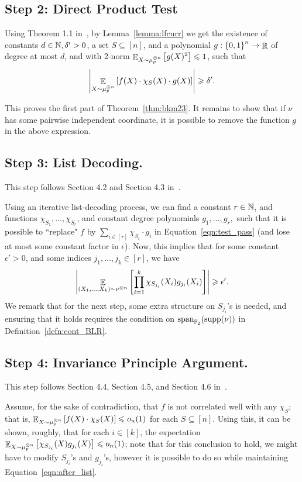 \subsection*{Step 2: Direct Product Test}
Using Theorem 1.1 in~\cite{BKM23b}, by Lemma~\ref{lemma:lfcurr} we get the existence of constants $d\in \mathbb{N}, \delta'>0$, a set $S\subseteq [n]$, and a polynomial $g:\left\{ 0,1 \right\}^n\to \mathop{\mathbb{R}}$ of degree at most $d$, and with 2-norm $\mathop{\mathbb{E}}_{X\sim \mu_p^{\otimes n} }\left[ g(X)^2 \right]\leqslant 1$, such that \[ \left|\mathop{\mathbb{E}}_{X\sim \mu_p^{\otimes n}}\left[ f(X)\cdot \chi_S(X)\cdot g(X) \right]\right| \geqslant \delta' .\]
	
This proves the first part of Theorem~\ref{thm:bkm23}.
It remains to show that if $\nu$ has some pairwise independent coordinate, it is possible to remove the function $g$ in the above expression.
	
\subsection*{Step 3: List Decoding.} This step follows Section 4.2 and Section 4.3 in~\cite{BKM23b}.

Using an iterative list-decoding process, we can find a constant $r\in \mathbb{N}$, and functions $\chi_{S_1}, \dots, \chi_{S_r}$, and constant degree polynomials $g_1,\dots, g_r,$ such that it is possible to ``replace" $f$ by $\sum_{i\in [r]}\chi_{S_i}\cdot g_i$ in Equation~\ref{eqn:test_pass} (and lose at most some constant factor in $\epsilon$).
Now, this implies that for some constant $\epsilon'>0$, and some indices $j_1,\dots,j_k\in [r]$, we have  
\begin{equation}\label{eqn:after_list}
	\left|\mathop{\mathbb{E}}_{(X_1,\dots,X_k)\sim \nu^{\otimes n}} \left[ \prod_{i=1}^k \chi_{S_{j_i}}(X_i) g_{j_i}(X_i)  \right] \right|\geqslant \epsilon'.
\end{equation}
We remark that for the next step, some extra structure on $S_{j_i}$'s is needed, and ensuring that it holds requires the condition on $\textnormal{span}_{\mathbb{F}_2}(\textnormal{supp}(\nu))$ in Definition~\ref{defn:cont_BLR}.
	
\subsection*{Step 4: Invariance Principle Argument.}
This step follows Section 4.4, Section 4.5, and Section 4.6 in~\cite{BKM23b}. 

Assume, for the sake of contradiction, that $f$ is not correlated well with any $\chi_S$; that is, $\mathop{\mathbb{E}}_{X\sim \mu_p^{\otimes n}} \left[ f(X)\cdot \chi_S(X) \right] \leqslant o_n(1)$ for each $S\subseteq [n]$.
Using this, it can be shown, roughly, that for each $i\in [k]$, the expectation $\mathop{\mathbb{E}}_{X\sim \mu_p^{\otimes n}}\left[ \chi_{S_{j_i}}(X) g_{j_i}(X) \right] \leqslant o_n(1)$; note that for this conclusion to hold, we might have to modify $S_{j_i}$'s and $g_{j_i}$'s, however it is possible to do so while maintaining Equation~\ref{eqn:after_list}.

